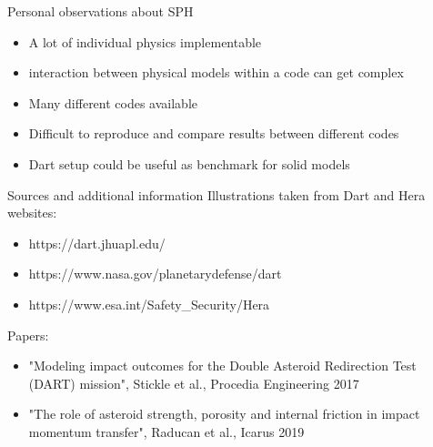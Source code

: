 \documentclass{beamer}
\begin{document}
\begin{frame}{Personal observations about SPH}
	\begin{itemize}[<+->]
	\item A lot of individual physics implementable 
	\item interaction between physical models within a code can get complex
	\item Many different codes available 
	\item Difficult to reproduce and compare results between different codes
	\item Dart setup could be useful as benchmark for solid models
	\end{itemize}
\end{frame}

\begin{frame}{Sources and additional information}
	Illustrations taken from Dart and Hera websites:
\begin{itemize}
	\item https://dart.jhuapl.edu/ 
	\item https://www.nasa.gov/planetarydefense/dart
	\item https://www.esa.int/Safety\_Security/Hera
\end{itemize} 
	Papers:
\begin{itemize}
	\item "Modeling impact outcomes for the Double Asteroid Redirection Test (DART) mission", Stickle et al., Procedia Engineering 2017
	\item "The role of asteroid strength, porosity and internal friction in impact momentum transfer", Raducan et al., Icarus 2019
\end{itemize} 
\end{frame}
\end{document}
